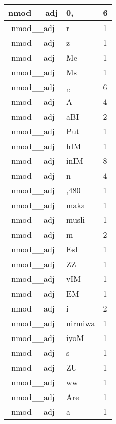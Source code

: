 \documentclass[a4 paper]{article}
\begin{document}
\begin{longtable}{cp{}p{}}
nmod\_\_adj & 0, & 6\\ \midrule nmod\_\_adj & r & 1\\ \midrule nmod\_\_adj & z & 1\\ \midrule nmod\_\_adj & Me & 1\\ \midrule nmod\_\_adj & Ms & 1\\ \midrule nmod\_\_adj & ,, & 6\\ \midrule nmod\_\_adj & A & 4\\ \midrule nmod\_\_adj & aBI & 2\\ \midrule nmod\_\_adj & Put & 1\\ \midrule nmod\_\_adj & hIM & 1\\ \midrule nmod\_\_adj & inIM & 8\\ \midrule nmod\_\_adj & n & 4\\ \midrule nmod\_\_adj & ,480 & 1\\ \midrule nmod\_\_adj & maka & 1\\ \midrule nmod\_\_adj & musli & 1\\ \midrule nmod\_\_adj & m & 2\\ \midrule nmod\_\_adj & EsI & 1\\ \midrule nmod\_\_adj & ZZ & 1\\ \midrule nmod\_\_adj & vIM & 1\\ \midrule nmod\_\_adj & EM & 1\\ \midrule nmod\_\_adj & i & 2\\ \midrule nmod\_\_adj & nirmiwa & 1\\ \midrule nmod\_\_adj & iyoM & 1\\ \midrule nmod\_\_adj & s & 1\\ \midrule nmod\_\_adj & ZU & 1\\ \midrule nmod\_\_adj & ww & 1\\ \midrule nmod\_\_adj & Are & 1\\ \midrule nmod\_\_adj & a & 1\\ \midrule 

\end{longtable}
\end{document}
